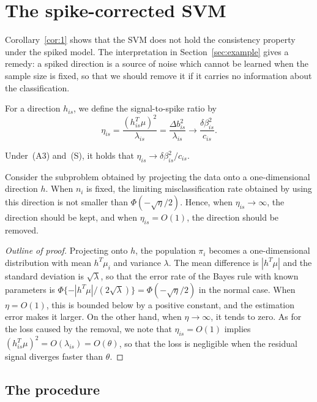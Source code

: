 \section{The spike-corrected SVM}
\label{sec:scsvm}

Corollary~\ref{cor:1} shows that the SVM does not hold the consistency property
under the spiked model. The interpretation in Section~\ref{sec:example} gives a
remedy: a spiked direction is a source of noise which cannot be learned when the
sample size is fixed, so that we should remove it if it carries no information about
the classification.

\begin{definition}
\label{def:1}
For a direction $h_{is}$, we define the signal-to-spike ratio by
\[
\eta_{is}=\frac{(h_{is}^T\mu)^2}{\lambda_{is}}=\frac{\Delta b_{is}^2}{\lambda_{is}}
\longrightarrow\frac{\delta\beta_{is}^2}{c_{is}}.
\]
\end{definition}

Under~(A3) and~(S), it holds that $\eta_{is}\to\delta\beta_{is}^2/c_{is}$.

\begin{proposition}
\label{prop:2}
Consider the subproblem obtained by projecting the data onto a one-dimensional
direction $h$. When $n_i$ is fixed, the limiting misclassification rate obtained by
using this direction is not smaller than $\Phi(-\sqrt{\eta}/2)$. Hence, when
$\eta_{is}\to\infty$, the direction should be kept, and when $\eta_{is}=O(1)$, the
direction should be removed.
\end{proposition}

\begin{proof}[Outline of proof]
Projecting onto $h$, the population $\pi_i$ becomes a one-dimensional distribution
with mean $h^T\mu_i$ and variance $\lambda$. The mean difference is $|h^T\mu|$ and
the standard deviation is $\sqrt{\lambda}$, so that the error rate of the Bayes
rule with known parameters is $\Phi\{-|h^T\mu|/(2\sqrt{\lambda})\}=\Phi(-\sqrt{\eta}/2)$
in the normal case. When $\eta=O(1)$, this is bounded below by a positive constant,
and the estimation error makes it larger. On the other hand, when $\eta\to\infty$,
it tends to zero. As for the loss caused by the removal, we note that
$\eta_{is}=O(1)$ implies $(h_{is}^T\mu)^2=O(\lambda_{is})=O(\theta)$, so that the
loss is negligible when the residual signal diverges faster than $\theta$.
\end{proof}

\subsection{The procedure}

